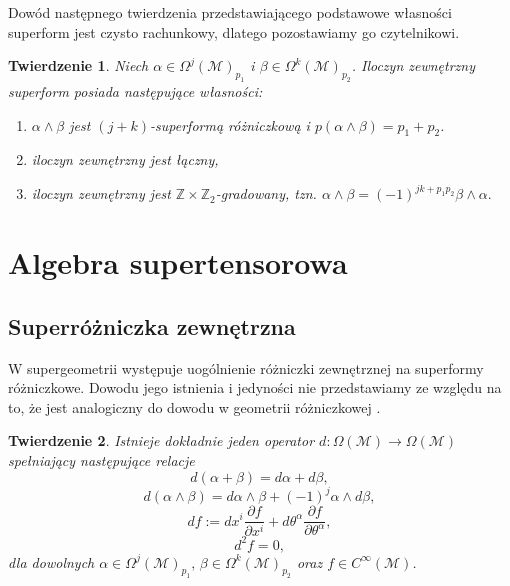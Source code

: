 \documentclass[11pt,a4paper]{report}
\newtheorem{theorem}{Twierdzenie}[section]
\theoremstyle{definition}
\begin{document}
Dowód następnego twierdzenia przedstawiającego podstawowe własności superform jest czysto rachunkowy, dlatego pozostawiamy go czytelnikowi.

\begin{theorem}
Niech $\alpha \in \Omega^j (\mathcal{M})_{p_1}\!$ i $\beta\in \Omega^k (\mathcal{M})_{p_2}$. Iloczyn zewnętrzny superform posiada następujące własności:
\begin{enumerate}[(1)]
	\item $\alpha\wedge \beta$ jest $(j+k)$-superformą różniczkową i $p(\alpha \wedge \beta)=p_1 + p_2$.
	\item iloczyn zewnętrzny jest łączny,
	\item iloczyn zewnętrzny jest $\mathbb{Z}\times \mathbb{Z}_2$-gradowany, tzn.  $\alpha\wedge\beta=(-1)^{jk+p_1 p_2}\beta\wedge\alpha.$
\end{enumerate}
\end{theorem}

\section{Algebra supertensorowa}

\subsection{Superróżniczka zewnętrzna}

W supergeometrii występuje uogólnienie różniczki zewnętrznej na superformy różniczkowe. Dowodu jego istnienia i jedyności nie przedstawiamy ze względu na to, że jest analogiczny do dowodu w geometrii różniczkowej \cite{rogers}.

\begin{theorem}\label{SupRozZew} 
Istnieje dokładnie jeden operator $d: \Omega (\mathcal{M}) \rightarrow \Omega (\mathcal{M})$ spełniający następujące relacje
\begin{equation}
d(\alpha+\beta)=d\alpha+d\beta,
\end{equation}
\begin{equation}
d(\alpha\wedge \beta)=d\alpha\wedge \beta+(-1)^j \alpha\wedge d\beta,
\end{equation}
\begin{equation}
df:=dx^i\frac{\partial f}{\partial x^i}+d\theta^\alpha\frac{\partial f}{\partial \theta^\alpha},
\end{equation}
\begin{equation}
d^2f=0,
\end{equation}
dla dowolnych $\alpha \in \Omega^j (\mathcal{M})_{p_1},\, \beta\in \Omega^k (\mathcal{M})_{p_2}$ oraz $f \in C^\infty (\mathcal M)$.
\end{theorem}
\end{document}
